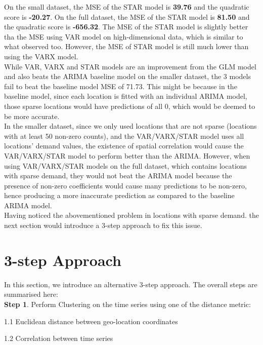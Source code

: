 \documentclass[nonblindrev,msom]{informs3} %
\begin{document}
On the small dataset, the MSE of the STAR model is \textbf{39.76} and the quadratic score is \textbf{-20.27}. On the full dataset, the MSE of the STAR model is \textbf{81.50} and the quadratic score is \textbf{-656.32}. The MSE of the STAR model is slightly better tha the MSE using VAR model on high-dimensional data, which is similar to what \cite{Abolfazl2017} observed too. However, the MSE of STAR model is still much lower than using the VARX model. \\

\noindent While VAR, VARX and STAR models are an improvement from the GLM model and also beats the ARIMA baseline model on the smaller dataset, the 3 models fail to beat the baseline model MSE of 71.73. This might be because in the baseline model, since each location is fitted with an individual ARIMA model, those sparse locations would have predictions of all 0, which would be deemed to be more accurate. \\

\noindent In the smaller dataset, since we only used locations that are not sparse (locations with at least 50 non-zero counts), and the VAR/VARX/STAR model uses all locations' demand values, the existence of spatial correlation would cause the VAR/VARX/STAR model to perform better than the ARIMA. However, when using VAR/VARX/STAR models on the full dataset, which contains locations with sparse demand, they would not beat the ARIMA model because the presence of non-zero coefficients would cause many predictions to be non-zero, hence producing a more inaccurate prediction as compared to the baseline ARIMA model. \\

\noindent Having noticed the abovementioned problem in locations with sparse demand. the next section would introduce a 3-step approach to fix this issue. 

\section{3-step Approach}

In this section, we introduce an alternative 3-step approach. The overall steps are summarised here: \\

\noindent \textbf{Step 1}. Perform Clustering on the time series using one of the distance metric: 

	1.1 Euclidean distance between geo-location coordinates
	
	1.2 Correlation between time series 
	
\end{document}
